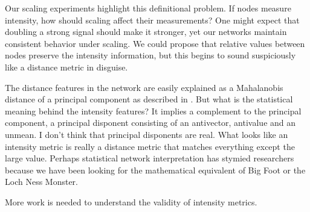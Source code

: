 Our scaling experiments highlight this definitional problem. If nodes measure intensity, how should scaling affect their measurements? One might expect that doubling a strong signal should make it stronger, yet our networks maintain consistent behavior under scaling. We could propose that relative values between nodes preserve the intensity information, but this begins to sound suspiciously like a distance metric in disguise.

The distance features in the network are easily explained as a Mahalanobis distance of a principal component as described in \cite{oursland2024interpreting}. But what is the statistical meaning behind the intensity features? It implies a complement to the principal component, a principal disponent consisting of an antivector, antivalue and an unmean. I don't think that principal disponents are real. What looks like an intensity metric is really a distance metric that matches everything except the large value. Perhaps statistical network interpretation has stymied researchers because we have been looking for the mathematical equivalent of Big Foot or the Loch Ness Monster.

More work is needed to understand the validity of intensity metrics.
